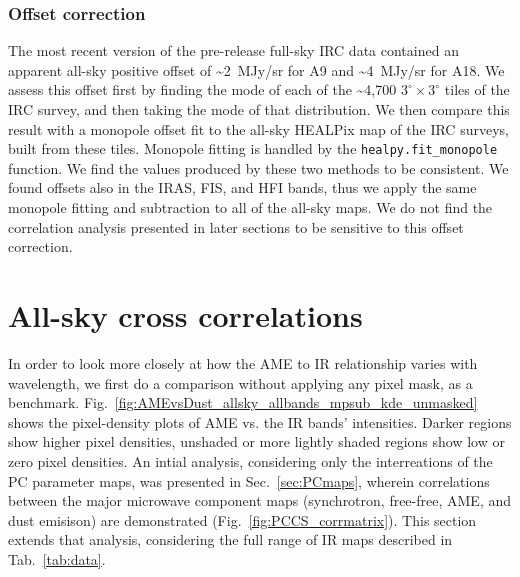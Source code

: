     \subsubsection{Offset correction}
      The most recent version of the pre-release full-sky IRC data contained an apparent all-sky positive offset of \textasciitilde{}2~MJy/sr for A9 and \textasciitilde{}4~MJy/sr for A18. We assess this offset first by finding the mode of each of the \textasciitilde{}4,700 $3^{\circ}\times3^{\circ}$ tiles of the IRC survey, and then taking the mode of that distribution. We then compare this result with a monopole offset fit to the all-sky HEALPix map of the IRC surveys, built from these tiles. Monopole fitting is handled by the {\tt healpy.fit\_monopole} function. We find the values produced by these two methods to be consistent. We found offsets also in the IRAS, FIS, and HFI bands, thus we apply the same monopole fitting and subtraction to all of the all-sky maps. We do not find the correlation analysis presented in later sections to be sensitive to this offset correction.

  \section{All-sky cross correlations}
        In order to look more closely at how the AME to IR relationship varies with wavelength, we first do a comparison without applying any pixel mask, as a benchmark. Fig.~\ref{fig:AMEvsDust_allsky_allbands_mpsub_kde_unmasked} shows the pixel-density plots of AME vs. the IR bands' intensities. Darker regions show higher pixel densities, unshaded or more lightly shaded regions show low or zero pixel densities. An intial analysis, considering only the interreations of the PC parameter maps, was presented in Sec.~\ref{sec:PCmaps}, wherein correlations between the major microwave component maps (synchrotron, free-free, AME, and dust emisison) are demonstrated (Fig.~\ref{fig:PCCS_corrmatrix}). This section extends that analysis, considering the full range of IR maps described in Tab.~\ref{tab:data}.

